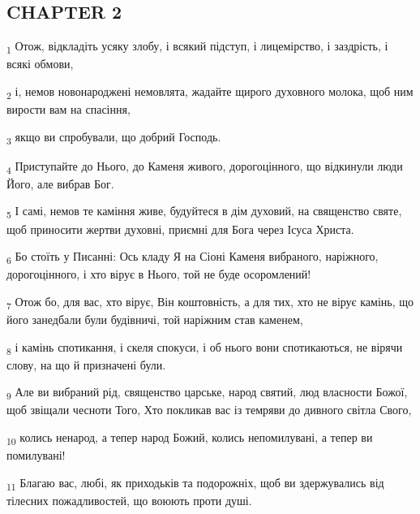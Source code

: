 \subsection{CHAPTER 2}
\begin{tcolorbox}
\textsubscript{1} Отож, відкладіть усяку злобу, і всякий підступ, і лицемірство, і заздрість, і всякі обмови,
\end{tcolorbox}
\begin{tcolorbox}
\textsubscript{2} і, немов новонароджені немовлята, жадайте щирого духовного молока, щоб ним вирости вам на спасіння,
\end{tcolorbox}
\begin{tcolorbox}
\textsubscript{3} якщо ви спробували, що добрий Господь.
\end{tcolorbox}
\begin{tcolorbox}
\textsubscript{4} Приступайте до Нього, до Каменя живого, дорогоцінного, що відкинули люди Його, але вибрав Бог.
\end{tcolorbox}
\begin{tcolorbox}
\textsubscript{5} І самі, немов те каміння живе, будуйтеся в дім духовий, на священство святе, щоб приносити жертви духовні, приємні для Бога через Ісуса Христа.
\end{tcolorbox}
\begin{tcolorbox}
\textsubscript{6} Бо стоїть у Писанні: Ось кладу Я на Сіоні Каменя вибраного, наріжного, дорогоцінного, і хто вірує в Нього, той не буде осоромлений!
\end{tcolorbox}
\begin{tcolorbox}
\textsubscript{7} Отож бо, для вас, хто вірує, Він коштовність, а для тих, хто не вірує камінь, що його занедбали були будівничі, той наріжним став каменем,
\end{tcolorbox}
\begin{tcolorbox}
\textsubscript{8} і камінь спотикання, і скеля спокуси, і об нього вони спотикаються, не вірячи слову, на що й призначені були.
\end{tcolorbox}
\begin{tcolorbox}
\textsubscript{9} Але ви вибраний рід, священство царське, народ святий, люд власности Божої, щоб звіщали чесноти Того, Хто покликав вас із темряви до дивного світла Свого,
\end{tcolorbox}
\begin{tcolorbox}
\textsubscript{10} колись ненарод, а тепер народ Божий, колись непомилувані, а тепер ви помилувані!
\end{tcolorbox}
\begin{tcolorbox}
\textsubscript{11} Благаю вас, любі, як приходьків та подорожніх, щоб ви здержувались від тілесних пожадливостей, що воюють проти душі.
\end{tcolorbox}
